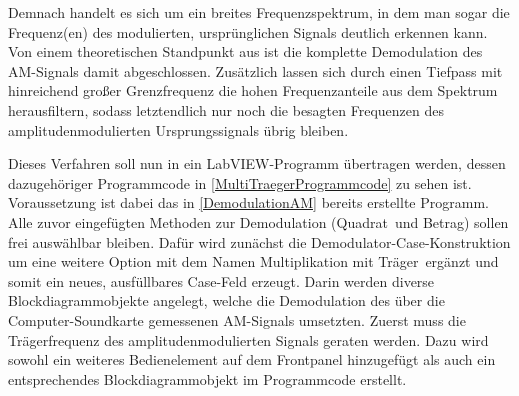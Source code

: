 \documentclass[
a4paper,
12pt,
pagesize,
ngerman
]{scrartcl}
\begin{document}
	\noindent Demnach handelt es sich um ein breites Frequenzspektrum, in dem man sogar die Frequenz(en) des modulierten, ursprünglichen Signals deutlich erkennen kann. Von einem theoretischen Standpunkt aus ist die komplette Demodulation des AM-Signals damit abgeschlossen. Zusätzlich lassen sich durch einen Tiefpass mit hinreichend großer Grenzfrequenz die hohen Frequenzanteile aus dem Spektrum herausfiltern, sodass letztendlich nur noch die besagten Frequenzen des amplitudenmodulierten Ursprungssignals übrig bleiben. 
	
	Dieses Verfahren soll nun in ein LabVIEW-Programm übertragen werden, dessen dazugehöriger Programmcode in \ref{MultiTraegerProgrammcode} zu sehen ist. Voraussetzung ist dabei das in \cref{DemodulationAM} bereits erstellte Programm. Alle zuvor eingefügten Methoden zur Demodulation (\glqq Quadrat\grqq\ und \glqq Betrag\grqq ) sollen frei auswählbar bleiben. Dafür wird zunächst die Demodulator-Case-Konstruktion um eine weitere Option mit dem Namen \glqq Multiplikation mit Träger\grqq\ ergänzt und somit ein neues, ausfüllbares Case-Feld erzeugt. Darin werden diverse Blockdiagrammobjekte angelegt, welche die Demodulation des über die Computer-Soundkarte gemessenen AM-Signals umsetzten. Zuerst muss die Trägerfrequenz des amplitudenmodulierten Signals geraten werden. Dazu wird sowohl ein weiteres Bedienelement auf dem Frontpanel hinzugefügt als auch ein entsprechendes Blockdiagrammobjekt im Programmcode erstellt.
	
\end{document}
